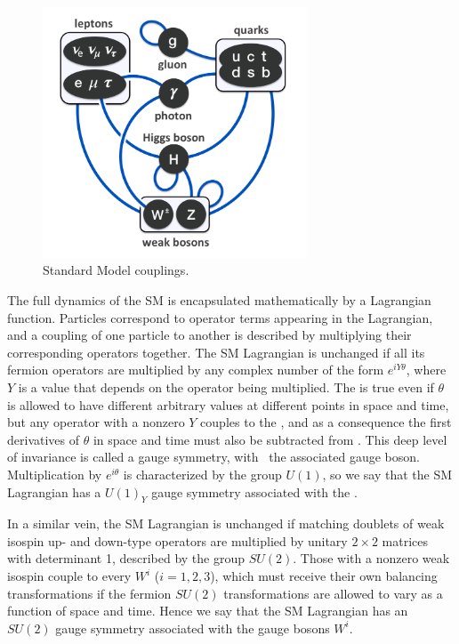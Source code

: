 \documentclass[oneside, letterpaper, 12pt, oldfontcommands]{memoir}
\begin{document}
\begin{figure}[hbtp]
  \begin{center}
    \includegraphics[width=0.7\textwidth]{Figures/Elementary_particle_interactions_in_the_Standard_Model.png}
    \caption{
      Standard Model couplings.
    }
    \label{fig:sm_interactions}
  \end{center}
\end{figure}

The full dynamics of the SM is encapsulated mathematically by a Lagrangian function. Particles correspond to operator
terms appearing in the Lagrangian, and a coupling of one particle to another is described by multiplying their
corresponding operators together. The SM Lagrangian is unchanged
if all its fermion operators are multiplied by any complex number of the form $e^{iY\theta}$, where $Y$ is a value that depends
on the operator being multiplied. The is true even if $\theta$ is allowed to have different arbitrary values at
different points in space and time, but any operator with a nonzero $Y$ couples to the \PB, and as a consequence the first derivatives
of $\theta$ in space and time must also be subtracted from \PB.
This deep level of invariance is called a gauge symmetry, with \PB\ the associated gauge boson.
Multiplication by $e^{i\theta}$ is characterized by the group $U(1)$, so we say that the SM Lagrangian has a
$U(1)_{Y}$ gauge symmetry associated with the \PB.

In a similar vein, the SM Lagrangian is unchanged if matching doublets
of weak isospin up- and down-type operators are multiplied by unitary $2\times2$ matrices with determinant 1, described by the
group $SU(2)$. Those with a nonzero weak isospin couple to every $W^{i}$ ($i=1,2,3$), which must receive their own balancing transformations
if the fermion $SU(2)$ transformations are allowed to vary as a function of space and time.
Hence we say that the SM Lagrangian has an $SU(2)$ gauge symmetry associated with the gauge bosons $W^{i}$.
\end{document}
